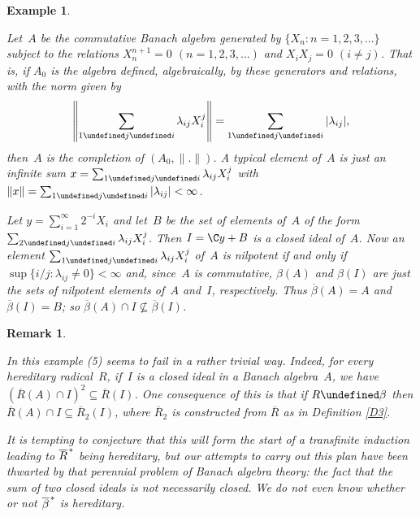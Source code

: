 \documentclass[11pt]{article}
\newcommand{\sseq}{\subseteq}
\let\leq\undefined  \let\geq\undefined
\let\le\leq   \let\ge\geq
\newcommand{\closure}[1]{\overline{#1}}
\newtheorem{example}[thm]{Example}
\newtheorem{remk}[thm]{Remark}
\newenvironment{Example}{\begin{example}\begin{rm}}{\end{rm}\end{example}}
\newenvironment{Remark}{\begin{remk}\begin{rm}}{\end{rm}\end{remk}}
\newcommand{\Detail}[1]{}
\newcommand{\Rbar}{\overline{R}}
\newcommand{\barstar}[1]{{\closure{#1}\kern 1pt}^*}
\begin{document}
\begin{Example}\label{Ex5}
Let~$A$ be the commutative Banach algebra generated by $\{X_n: n=1,2,3,\dots\}$
subject to the relations $X_n^{n+1}=0$ $(n=1,2,3,\dots)$ and $X_iX_j=0$
$(i \ne j)$.  That is, if $A_0$ is the algebra defined, algebraically, by
these generators and relations, with the norm given by
$$\left\|\sum_{1\le j\le i} \lambda_{ij}X_i^j\right\|
                                    = \sum_{1\le j\le i} |\lambda_{ij}|,$$
then~$A$ is the completion of $(A_0,\|.\|)$.  A typical element of~$A$ is just
an infinite sum $x = \sum_{1\le j\le i} \lambda_{ij}X_i^j$ with
$\|x\| = \sum_{1\le j\le i} |\lambda_{ij}| < \infty$.

Let $y = \sum_{i=1}^\infty 2^{-i}X_i$ and let~$B$ be the set of elements
of~$A$ of the form $\sum_{2\le j\le i} \lambda_{ij}X_i^j$.    Then
$I = \C y + B$ is a closed ideal of~$A$.   Now an element
$\sum_{1\le j\le i} \lambda_{ij}X_i^j$ of~$A$ is nilpotent if and only if
$\sup\{i/j:\lambda_{ij} \ne 0\} < \infty$ and, since~$A$ is commutative,
$\beta(A)$ and $\beta(I)$ are just the sets of nilpotent elements of~$A$ and~$I$,
respectively.  Thus $\overline{\beta}(A) = A$ and $\overline{\beta}(I) = B$;
so $\overline{\beta}(A) \cap I \not\sseq \overline{\beta}(I)$.
\end{Example}

\begin{Remark}
In this example (5) seems to fail in a rather trivial way.  Indeed, for
every hereditary radical~$R$, if~$I$ is a closed ideal in a Banach
algebra~$A$,  we have $(\Rbar(A) \cap I)^2 \sseq \Rbar(I)$.  One consequence of this
is that if $R \ge \beta$ then $\Rbar(A) \cap I \sseq \Rbar_2(I)$, where
$\Rbar_2$ is constructed from $\Rbar$ as in Definition \ref{D3}.
\Detail{Let $x,y \in \Rbar(A) \cap I$.  There exist $x_n \in R(A)$ $(n =
1,2,3,\dots)$ with $x_n \to x$.   Then $x_ny \in R(A)I \sseq R(A) \cap I \sseq
R(I)$, because~$R$ is hereditary.  So $xy \in \Rbar(I)$, whence the result.

The second statement follows because the condition $R \ge \beta$ is equivalent
to saying that every nilpotent ideal of an algebra~$A$ is contained in $R(A)$;
a property sometimes labelled {\it supernilpotent}.}
It is tempting to conjecture that this will form the start of a
transfinite induction leading to $\barstar{R}$ being hereditary, but our
attempts to carry out this plan have been thwarted by that perennial problem of
Banach algebra theory: the fact that the sum of two closed ideals is not
necessarily closed.  We do not even know whether or not $\barstar{\beta}$ is
hereditary.
\end{Remark}
\end{document}
